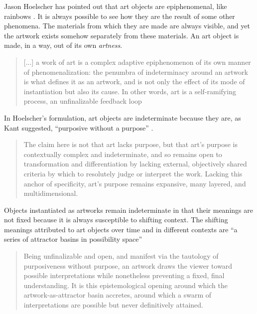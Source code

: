 \documentclass[letterpaper]{article}
\begin{document}
    Jason Hoelscher has pointed out that art objects are epiphenomenal, like rainbows \citep[p.17]{HoelscherArtAsInfrmtn2021}. It is always possible to see how they are the result of some other phenomena. The materials from which they are made are always visible, and yet the artwork exists somehow separately from these materials. An art object is made, in a way, out of its own \emph{artness}.
    
    \begin{quote}
        [...] a work of art is a complex adaptive epiphenomenon of its own manner of phenomenalization: the penumbra of indeterminacy around an artwork is what defines it as an artwork, and is not only the effect of its mode of instantiation but also its cause. In other words, art is a self-ramifying process, an unfinalizable feedback loop \citep[p.2]{HoelscherThPtcsOfPhsSpc2014}
    \end{quote}

    In Hoelscher's formulation, art objects are indeterminate because they are, as Kant suggested, “purposive without a purpose” \citep[p.57]{KantCrtqOfJdgmnt}.

    \begin{quote}
        The claim here is not that art lacks purpose, but that art's purpose is contextually complex and indeterminate, and so remains open to transformation and differentiation by lacking external, objectively shared criteria by which to resolutely judge or interpret the work. Lacking this anchor of specificity, art's purpose remains expansive, many layered, and multidimensional.\citep[p.25]{HoelscherThPtcsOfPhsSpc2014}
    \end{quote}

    Objects instantiated as artworks remain indeterminate in that their meanings are not fixed because it is always susceptible to shifting context. The shifting meanings attributed to art objects over time and in different contexts are “a series of attractor basins in possibility space” \citep[p.4]{HoelscherThPtcsOfPhsSpc2014}
    
    \begin{quote}
        Being unfinalizable and open, and manifest via the tautology of purposiveness without purpose, an artwork draws the viewer toward possible interpretations while nonetheless preventing a fixed, final understanding. It is this epistemological opening around which the artwork-as-attractor basin accretes, around which a swarm of interpretations are possible but never definitively attained. \citep[p.12]{HoelscherThPtcsOfPhsSpc2014}
    \end{quote}
\end{document}

